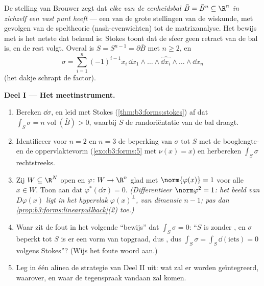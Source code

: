 \begin{problem}\label{pb:b3:forms:1}
De stelling van Brouwer zegt dat \emph{elke 
van de  eenheidsbal $\bar B = \bar B^n \subseteq \R^n$ in
zichzelf een vast punt heeft} --- een van de grote stellingen van
de wiskunde, met gevolgen van de speltheorie (nash-evenwichten)
tot de matrixanalyse. Het bewijs met  is het
netste dat bekend is: Stokes toont dat de sfeer geen retract van
de bal is, en de rest volgt. Overal is $S = S^{n-1} = \partial\bar
B$ met $n \geq 2$, en
\[
\sigma = \sum_{i=1}^n(-1)^{i-1}x_i\,
\dd x_1\wedge\dots\wedge\widehat{\dd x_i}\wedge\dots\wedge
\dd x_n
\]
(het dakje schrapt de factor).

\medskip
\noindent\textbf{Deel I --- Het meetinstrument.}
\begin{enumerate}
  \item Bereken $\dd\sigma$, en leid met Stokes
        (\cref{thm:b3:forms:stokes}) af dat $\int_S\sigma =
        n\operatorname{vol}(\bar B) > 0$, waarbij $S$ de
        randoriëntatie van de bal draagt.
  \item Identificeer voor $n = 2$ en $n = 3$ de beperking van
        $\sigma$ tot $S$ met de booglengte- en de
        oppervlaktevorm (\cref{exo:b3:forms:5} met $\nu(x) = x$)
        en herbereken $\int_S\sigma$ rechtstreeks.
  \item Zij $W \subseteq \R^N$ open en $\varphi\colon W \to \R^n$
        glad met $\norm{\varphi(x)} = 1$ voor alle $x \in W$.
        Toon aan dat $\varphi^*(\dd\sigma) = 0$.
        \emph{(Differentieer $\norm\varphi^2 = 1$: het beeld van
        $D\varphi(x)$ ligt in het hypervlak $\varphi(x)^\perp$,
        van dimensie $n - 1$; pas dan
        \cref{prop:b3:forms:linearpullback}(2) toe.)}
  \item Waar zit de fout in het volgende ``bewijs'' dat
        $\int_S\sigma = 0$: ``$S$ is  zonder , en
        $\sigma$ beperkt tot $S$ is er een vorm van topgraad, dus
        , dus $\int_S\sigma = \int_S\dd(\text{iets}) = 0$
        volgens Stokes''? (Wijs het foute woord aan.)
  \item Leg in één alinea de strategie van Deel II uit: wat zal
        er worden geïntegreerd, waarover, en waar de tegenspraak
        vandaan zal komen.
\end{enumerate}


\end{problem}
